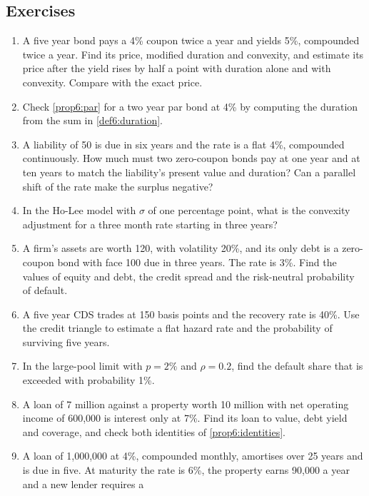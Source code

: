 \begin{chapterrefs}
\section{Exercises}
\label{sec6:exercises}

\begin{enumerate}[label=\textbf{6.\arabic*}, leftmargin=*, ref=6.\arabic*]
  \item\label{ex6:one} A five year bond pays a 4\% coupon twice a year and yields 5\%, compounded
  twice a year. Find its price, modified duration and convexity, and estimate its price after the
  yield rises by half a point with duration alone and with convexity. Compare with the exact price.
  \item\label{ex6:two} Check \cref{prop6:par} for a two year par bond at 4\% by computing the duration
  from the sum in \cref{def6:duration}.
  \item\label{ex6:three} A liability of 50 is due in six years and the rate is a flat 4\%, compounded
  continuously. How much must two zero-coupon bonds pay at one year and at ten years to match the
  liability's present value and duration? Can a parallel shift of the rate make the surplus negative?
  \item\label{ex6:four} In the Ho-Lee model with $\sigma$ of one percentage point, what is the
  convexity adjustment for a three month rate starting in three years?
  \item\label{ex6:five} A firm's assets are worth 120, with volatility 20\%, and its only debt is a
  zero-coupon bond with face 100 due in three years. The rate is 3\%. Find the values of equity and
  debt, the credit spread and the risk-neutral probability of default.
  \item\label{ex6:six} A five year CDS trades at 150 basis points and the recovery rate is 40\%. Use
  the credit triangle to estimate a flat hazard rate and the probability of surviving five years.
  \item\label{ex6:seven} In the large-pool limit with $p=2\%$ and $\rho=0.2$, find the default share that
  is exceeded with probability 1\%.
  \item\label{ex6:eight} A loan of 7 million against a property worth 10 million with net operating
  income of 600,000 is interest only at 7\%. Find its loan to value, debt yield and coverage, and check
  both identities of \cref{prop6:identities}.
  \item\label{ex6:nine} A loan of 1,000,000 at 4\%, compounded monthly, amortises over 25 years and is
  due in five. At maturity the rate is 6\%, the property earns 90,000 a year and a new lender requires a

\end{enumerate}
\end{chapterrefs}
